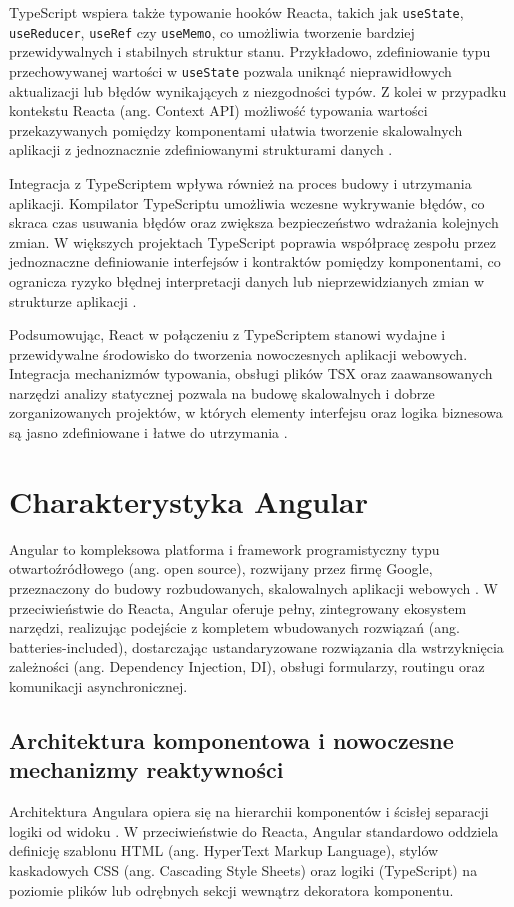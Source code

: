 \documentclass[12pt,openright,twoside]{report}
\begin{document}
TypeScript wspiera także typowanie hooków Reacta, takich jak \texttt{useState}, \texttt{useReducer}, \texttt{useRef} czy \texttt{useMemo}, co umożliwia tworzenie bardziej przewidywalnych i stabilnych struktur stanu. Przykładowo, zdefiniowanie typu przechowywanej wartości w \texttt{useState} pozwala uniknąć nieprawidłowych aktualizacji lub błędów wynikających z niezgodności typów. Z kolei w przypadku kontekstu Reacta (ang. Context API) możliwość typowania wartości przekazywanych pomiędzy komponentami ułatwia tworzenie skalowalnych aplikacji z jednoznacznie zdefiniowanymi strukturami danych \cite{Pro_TypeScript}.

Integracja z TypeScriptem wpływa również na proces budowy i utrzymania aplikacji. Kompilator TypeScriptu umożliwia wczesne wykrywanie błędów, co skraca czas usuwania błędów oraz zwiększa bezpieczeństwo wdrażania kolejnych zmian. W większych projektach TypeScript poprawia współpracę zespołu przez jednoznaczne definiowanie interfejsów i kontraktów pomiędzy komponentami, co ogranicza ryzyko błędnej interpretacji danych lub nieprzewidzianych zmian w strukturze aplikacji \cite{Code_Complete}.

Podsumowując, React w połączeniu z TypeScriptem stanowi wydajne i przewidywalne środowisko do tworzenia nowoczesnych aplikacji webowych. Integracja mechanizmów typowania, obsługi plików TSX oraz zaawansowanych narzędzi analizy statycznej pozwala na budowę skalowalnych i dobrze zorganizowanych projektów, w których elementy interfejsu oraz logika biznesowa są jasno zdefiniowane i łatwe do utrzymania \cite{Learning_TS}.

\section{Charakterystyka Angular}
Angular to kompleksowa platforma i framework programistyczny typu otwartoźródłowego (ang. open source), rozwijany przez firmę Google, przeznaczony do budowy rozbudowanych, skalowalnych aplikacji webowych \cite{Angular_Docs}. W przeciwieństwie do Reacta, Angular oferuje pełny, zintegrowany ekosystem narzędzi, realizując podejście z kompletem wbudowanych rozwiązań (ang. batteries-included), dostarczając ustandaryzowane rozwiązania dla wstrzyknięcia zależności (ang. Dependency Injection, DI), obsługi formularzy, routingu oraz komunikacji asynchronicznej.

\subsection{Architektura komponentowa i nowoczesne mechanizmy reaktywności}
Architektura Angulara opiera się na hierarchii komponentów i ścisłej separacji logiki od widoku \cite{Angular_Development}. W przeciwieństwie do Reacta, Angular standardowo oddziela definicję szablonu HTML (ang. HyperText Markup Language), stylów kaskadowych CSS (ang. Cascading Style Sheets) oraz logiki (TypeScript) na poziomie plików lub odrębnych sekcji wewnątrz dekoratora komponentu.
\end{document}
